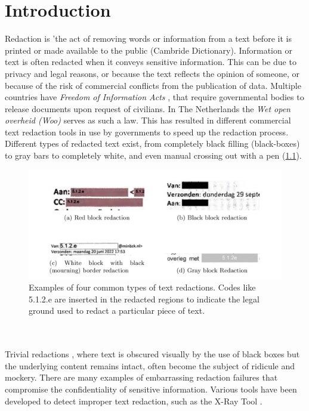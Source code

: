 \chapter{Introduction}

Redaction is 'the act of removing words or information from a text before it is printed or made available to the public (Cambride Dictionary). Information or text is often redacted when it conveys sensitive information. This can be due to privacy and legal reasons, or because the text reflects the opinion of someone, or because of the risk of commercial conflicts from the publication of data. Multiple countries have \textit{Freedom of Information Acts} \cite{USAFia}, that require governmental bodies to release documents upon request of civilians. In The Netherlands the \textit{Wet open overheid (Woo)} \cite{WooWebsite} serves as such a law. This has resulted in different commercial text redaction tools in use by governments to speed up the redaction process. Different types of redacted text exist, from completely black filling (black-boxes) to gray bars to completely white, and even manual crossing out with a pen 
(\ref{fig:redactionExamples}).
\begin{figure}[h]
\includegraphics[width=\textwidth]{media/img.png}
\centering
\caption{Examples of four common types of text redactions. Codes like 5.1.2.e are inserted in the redacted regions to indicate the legal ground used to redact a particular piece of text.}
\label{fig:redactionExamples}
\end{figure}\\\\
Trivial redactions \cite{forrester2005investigation}, where text is obscured visually by the use of black boxes but the underlying content remains intact, often become the subject of ridicule and mockery. There are many examples of embarrassing redaction failures \cite{failures2019} that compromise the confidentiality of  sensitive information. Various tools have been developed to detect improper text redaction, such as the X-Ray Tool \cite{Xray2021}.
